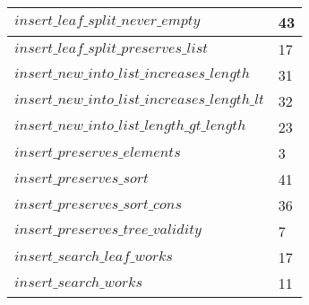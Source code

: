 \begin{tabular}{| l | l |}
$insert\_leaf\_split\_never\_empty$ & 43 \\ \hline
$insert\_leaf\_split\_preserves\_list$ & 17 \\ \hline
$insert\_new\_into\_list\_increases\_length$ & 31 \\ \hline
$insert\_new\_into\_list\_increases\_length\_lt$ & 32 \\ \hline
$insert\_new\_into\_list\_length\_gt\_length$ & 23 \\ \hline
$insert\_preserves\_elements$ & 3 \\ \hline
$insert\_preserves\_sort$ & 41 \\ \hline
$insert\_preserves\_sort\_cons$ & 36 \\ \hline
$insert\_preserves\_tree\_validity$ & 7 \\ \hline
$insert\_search\_leaf\_works$ & 17 \\ \hline
$insert\_search\_works$ & 11 \\ \hline
\end{tabular}
\newpage
